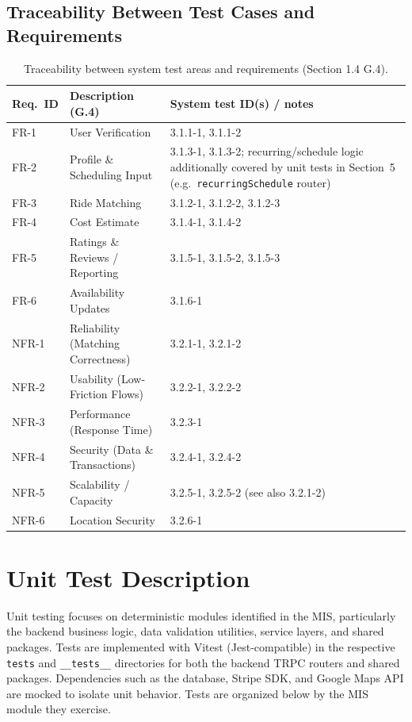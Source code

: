 \documentclass[12pt, titlepage]{article}
\begin{document}
\subsection{Traceability Between Test Cases and Requirements}

\begin{table}[H]
\centering
\small
\begin{tabular}{|l|p{4.2cm}|p{5.8cm}|}
\hline
\textbf{Req.\ ID} & \textbf{Description (G.4)} & \textbf{System test ID(s) / notes} \\ \hline
FR-1 & User Verification & 3.1.1-1, 3.1.1-2 \\ \hline
FR-2 & Profile \& Scheduling Input & 3.1.3-1, 3.1.3-2; recurring/schedule logic additionally covered by unit tests in Section~5 (e.g.\ \texttt{recurringSchedule} router) \\ \hline
FR-3 & Ride Matching & 3.1.2-1, 3.1.2-2, 3.1.2-3 \\ \hline
FR-4 & Cost Estimate & 3.1.4-1, 3.1.4-2 \\ \hline
FR-5 & Ratings \& Reviews / Reporting & 3.1.5-1, 3.1.5-2, 3.1.5-3 \\ \hline
FR-6 & Availability Updates & 3.1.6-1 \\ \hline
NFR-1 & Reliability (Matching Correctness) & 3.2.1-1, 3.2.1-2 \\ \hline
NFR-2 & Usability (Low-Friction Flows) & 3.2.2-1, 3.2.2-2 \\ \hline
NFR-3 & Performance (Response Time) & 3.2.3-1 \\ \hline
NFR-4 & Security (Data \& Transactions) & 3.2.4-1, 3.2.4-2 \\ \hline
NFR-5 & Scalability / Capacity & 3.2.5-1, 3.2.5-2 (see also 3.2.1-2) \\ \hline
NFR-6 & Location Security & 3.2.6-1 \\ \hline
\end{tabular}
\caption{Traceability between system test areas and requirements (Section 1.4 G.4).}
\end{table}


\section{Unit Test Description}

Unit testing focuses on deterministic modules identified in the MIS, particularly the backend business logic, data validation utilities, service layers, and shared packages. Tests are implemented with Vitest (Jest-compatible) in the respective \texttt{tests} and \texttt{\_\_tests\_\_} directories for both the backend TRPC routers and shared packages. Dependencies such as the database, Stripe SDK, and Google Maps API are mocked to isolate unit behavior. Tests are organized below by the MIS module they exercise.
\end{document}
